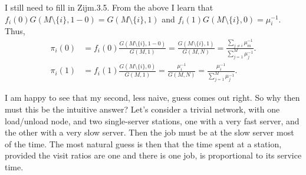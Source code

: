 \begin{exercise}
\begin{solution}
I still need to fill in Zijm.3.5. From the above I learn that
$f_i(0) G(M\setminus\{i\}, 1-0) = G(M\setminus\{i\}, 1)$ and
$f_i(1) G(M\setminus\{i\}, 0) = \mu_i^{-1}$. 
Thus, 
\begin{align*}
 \pi_i(0) &= f_i(0) \frac{G(M\setminus\{i\}, 1-0)}{G(M,1)} = \frac{G(M\setminus\{i\}, 1)}{G(M,N)} = 
\frac{\sum_{j\neq i} \mu_m^{-1}}{\sum_{j=1}^M \mu_j^{-1}}.
\\
 \pi_i(1) &= f_i(1) \frac{G(M\setminus\{i\}, 0)}{G(M,1)} = \frac{\mu_i^{-1}}{G(M,N)} = \frac{\mu_i^{-1}}{\sum_{j=1}^M \mu_j^{-1}}.
\end{align*}

I am happy to see that my second, less naive, guess comes out
right. So why then must this be the intuitive answer? Let's consider a
trivial network, with one load/unload node, and two single-server
stations, one with a very fast server, and the other with a very slow
server. Then the job must be at the slow server most of the time. The
most natural guess is then that the time spent at a station, provided
the visit ratios are one and there is one job, is proportional to its
service time.
\end{solution}
\end{exercise}


